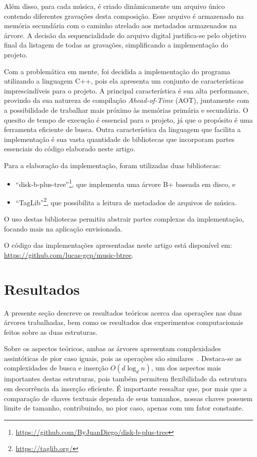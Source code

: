 \documentclass[12pt]{article}
\begin{document}
Além disso, para cada música, é criado dinâmicamente um arquivo único contendo diferentes gravações 
desta composição. Esse arquivo é armazenado na memória secundária com o caminho
atrelado aos metadados armazenados na árvore. A decisão da sequencialidade do
arquivo digital justifica-se pelo objetivo final da listagem de todas as
gravações, simplificando a implementação do projeto.

Com a problemática em mente, foi decidida a implementação do programa utilizando
a linguagem C++, pois ela apresenta um conjunto de características
imprescindíveis para o projeto. A principal característica é sua alta
performance, provindo da sua natureza de compilação \emph{Ahead-of-Time} (AOT),
juntamente com a possibilidade de trabalhar mais próximo às memórias primária e
secundária.
O quesito de tempo de execução é essencial para o projeto, já que o propósito é
uma ferramenta eficiente de busca.
Outra característica da linguagem que facilita a implementação é sua vasta
quantidade de bibliotecas que incorporam partes essenciais do código elaborado neste artigo.

Para a elaboração da implementação, foram utilizadas duas bibliotecas: 
\begin{itemize}
  \item ``disk-b-plus-tree''\footnote{\url{https://github.com/ByJuanDiego/disk-b-plus-tree}},
    que implementa uma árvore B+ baseada em disco, e
  \item ``TagLib''\footnote{\url{https://taglib.org/}},
    que possibilita a leitura de metadados de arquivos de música.
\end{itemize}
O uso destas bibliotecas permitiu abstrair partes complexas da implementação,
focando mais na aplicação envisionada.

O código das implementações apresentadas neste artigo está disponível em:
\url{https://github.com/lucas-gcp/music-btree}.

\section{Resultados} \label{sec:results}
A presente seção descreve os resultados teóricos acerca das operações nas duas
árvores trabalhadas, bem como os resultados dos experimentos computacionais
feitos sobre as duas estruturas.

Sobre os aspectos teóricos, ambas as árvores apresentam complexidades assintóticas
de pior caso iguais, pois as operações são similares~\cite{Co:79}.
Destaca-se as complexidades de busca e inserção $O(d \log_d n)$, um dos aspectos
mais importantes destas estruturas, pois também permitem flexibilidade da estrutura
em decorrência da inserção eficiente.
É importante ressaltar que, por mais que a comparação de chaves textuais dependa
de seus tamanhos, nossas chaves possuem limite de tamanho, contribuindo, no pior
caso, apenas com um fator constante.
\end{document}
